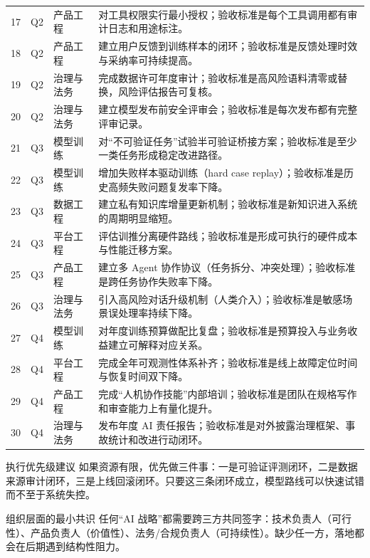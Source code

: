 \documentclass[a4paper]{article}
\begin{document}
\begin{longtable}{p{}p{}p{}p{}}
17 & Q2 & 产品工程 & 对工具权限实行最小授权；验收标准是每个工具调用都有审计日志和用途标注。 \\
18 & Q2 & 产品工程 & 建立用户反馈到训练样本的闭环；验收标准是反馈处理时效与采纳率可持续提高。 \\
19 & Q2 & 治理与法务 & 完成数据许可年度审计；验收标准是高风险语料清零或替换，风险评估报告可复核。 \\
20 & Q2 & 治理与法务 & 建立模型发布前安全评审会；验收标准是每次发布都有完整评审记录。 \\
21 & Q3 & 模型训练 & 对“不可验证任务”试验半可验证桥接方案；验收标准是至少一类任务形成稳定改进路径。 \\
22 & Q3 & 模型训练 & 增加失败样本驱动训练（hard case replay）；验收标准是历史高频失败问题复发率下降。 \\
23 & Q3 & 数据工程 & 建立私有知识库增量更新机制；验收标准是新知识进入系统的周期明显缩短。 \\
24 & Q3 & 平台工程 & 评估训推分离硬件路线；验收标准是形成可执行的硬件成本与性能迁移方案。 \\
25 & Q3 & 产品工程 & 建立多 Agent 协作协议（任务拆分、冲突处理）；验收标准是跨任务协作失败率下降。 \\
26 & Q3 & 治理与法务 & 引入高风险对话升级机制（人类介入）；验收标准是敏感场景误处理率持续下降。 \\
27 & Q4 & 模型训练 & 对年度训练预算做配比复盘；验收标准是预算投入与业务收益建立可解释对应关系。 \\
28 & Q4 & 平台工程 & 完成全年可观测性体系补齐；验收标准是线上故障定位时间与恢复时间双下降。 \\
29 & Q4 & 产品工程 & 完成“人机协作技能”内部培训；验收标准是团队在规格写作和审查能力上有量化提升。 \\
30 & Q4 & 治理与法务 & 发布年度 AI 责任报告；验收标准是对外披露治理框架、事故统计和改进行动闭环。 \\
\bottomrule
\end{longtable}

\begin{importantbox}{执行优先级建议}
如果资源有限，优先做三件事：一是可验证评测闭环，二是数据来源审计闭环，三是上线回滚闭环。只要这三条闭环成立，模型路线可以快速试错而不至于系统失控。
\end{importantbox}

\begin{knowledgebox}{组织层面的最小共识}
任何“AI 战略”都需要跨三方共同签字：技术负责人（可行性）、产品负责人（价值性）、法务/合规负责人（可持续性）。缺少任一方，落地都会在后期遇到结构性阻力。
\end{knowledgebox}
\end{document}

